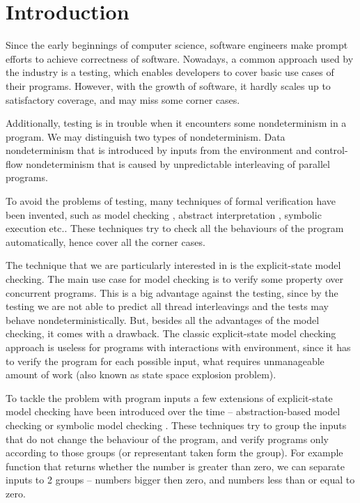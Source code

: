 \chapter{Introduction}\label{ch:Introduction}


\noindent
Since the early beginnings of computer science, software engineers make prompt
efforts to achieve correctness of software. Nowadays, a common approach used by
the industry is a testing, which enables developers to cover basic use cases of
their programs.  However, with the growth of software, it hardly scales up to
satisfactory coverage, and may miss some corner cases.

Additionally, testing is in trouble when it encounters some nondeterminism in a
program. We may distinguish two types of nondeterminism. Data nondeterminism
that is introduced by inputs from the environment and control-flow
nondeterminism that is caused by unpredictable interleaving of parallel
programs.

To avoid the problems of testing, many techniques of formal verification have
been invented, such as model checking \cite{Baier08}, abstract interpretation
\cite{Cousot14}, symbolic execution \cite{King76} etc.. These techniques try to
check all the behaviours of the program automatically, hence cover all the
corner cases.

The technique that we are particularly interested in is the explicit-state model
checking.  The main use case for model checking is to verify
some property over concurrent programs. This is a big advantage against
the testing, since by the testing we are not able to predict all thread
interleavings and the tests may behave nondeterministically. But,
besides all the advantages of the model checking, it comes with a
drawback. The classic explicit-state model checking approach is useless
for programs with interactions with environment, since it has to verify
the program for each possible input, what requires unmanageable amount
of work (also known as state space explosion problem).

To tackle the problem with program inputs a few extensions of explicit-state
model checking have been introduced over the time -- abstraction-based model
checking \cite{Clarke94} or symbolic model checking \cite{Clarke96}.  These
techniques try to group the inputs that do not change the behaviour of the
program, and verify programs only according to those groups (or representant
taken form the group). For example function that returns whether the
number is greater than zero, we can separate inputs to 2 groups -- numbers
bigger then zero, and numbers less than or equal to zero.


